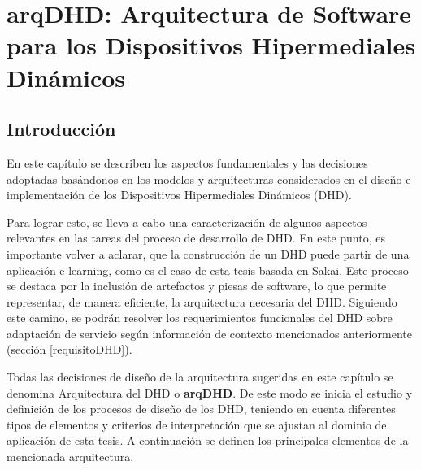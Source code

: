 ﻿%
\chapter{arqDHD: Arquitectura de Software para los Dispositivos Hipermediales Dinámicos}\label{cap:arqdhd}


\section{Introducción}\label{secc:arqDHD_Introduccion}

En este capítulo se describen los aspectos fundamentales y las decisiones adoptadas basándonos en los modelos y arquitecturas considerados en el diseño e implementación de los Dispositivos Hipermediales Dinámicos (DHD).

Para lograr esto, se lleva a cabo una caracterización de algunos aspectos relevantes en las tareas del proceso de desarrollo de DHD. En este punto, es importante volver a aclarar, que la construcción de un DHD puede partir de una aplicación e-learning, como es el caso de esta tesis basada en Sakai. Este proceso se destaca por la inclusión de artefactos y piesas de software, lo que permite representar, de manera eficiente, la arquitectura necesaria del DHD. Siguiendo este camino, se podrán resolver los requerimientos funcionales del DHD sobre adaptación de servicio según información de contexto mencionados anteriormente (sección \ref{requisitoDHD}).

Todas las decisiones de diseño de la arquitectura sugeridas en este capítulo se denomina Arquitectura del DHD o \textbf{arqDHD}. De este modo se inicia el estudio y definición de los procesos de diseño de los DHD, teniendo en cuenta diferentes tipos de elementos y criterios de interpretación que se ajustan al dominio de aplicación de esta tesis. A continuación se definen los principales elementos de la mencionada arquitectura. 


